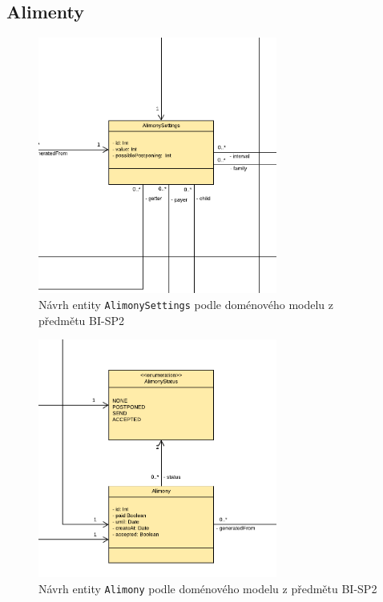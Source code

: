         
    \subsection{Alimenty}
        \begin{figure}\centering
	        \includegraphics[width=0.7\textwidth]{pdfs/AlimonySettings1}
	        \caption[Návrh entity \texttt{AlimonySettings}]{Návrh entity \texttt{AlimonySettings} podle doménového modelu z předmětu BI-SP2}\label{image:AlimonySettings1}
        \end{figure}
        \begin{figure}\centering
	        \includegraphics[width=0.7\textwidth]{pdfs/Alimony1}
	        \caption[Návrh entity \texttt{Alimony}]{Návrh entity \texttt{Alimony} podle doménového modelu z předmětu BI-SP2}\label{image:Alimony1}
        \end{figure}
